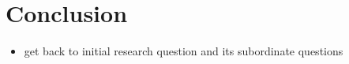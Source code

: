 \chapter{Conclusion}
\label{chap:conclusion}

\begin{itemize}
  \item
    get back to initial research question and its subordinate questions
\end{itemize}